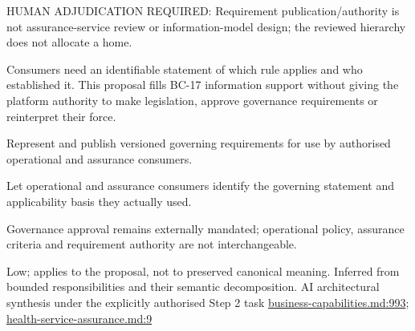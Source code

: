 HUMAN ADJUDICATION REQUIRED: Requirement publication/\allowbreak{}authority is not assurance-service review or information-model design; the reviewed hierarchy does not allocate a home.



Consumers need an identifiable statement of which rule applies and who established it. This proposal fills BC-17 information support without giving the platform authority to make legislation, approve governance requirements or reinterpret their force.



Represent and publish versioned governing requirements for use by authorised operational and assurance consumers.



Let operational and assurance consumers identify the governing statement and applicability basis they actually used.



Governance approval remains externally mandated; operational policy, assurance criteria and requirement authority are not interchangeable.


Low; applies to the proposal, not to preserved canonical meaning.
Inferred from bounded responsibilities and their semantic decomposition. AI architectural synthesis under the explicitly authorised Step 2 task \hyperref[evidence:a4c0900c47c945d9]{business-capabilities.md:993}; \hyperref[evidence:14c8f26d232fcb78]{health-service-assurance.md:9}
